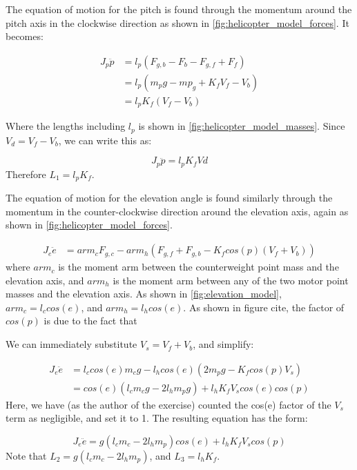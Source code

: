 The equation of motion for the pitch is found through the momentum
around the pitch axis in the clockwise direction as shown in
\cref{fig:helicopter_model_forces}. It becomes:

\begin{align*}
  J_p\ddot{p} &= l_p(F_{g,b} - F_b - F_{g,f} + F_f) \\
              &= l_p(m_pg - mp_g + K_fV_f - V_b) \\
              &= l_pK_f(V_f-V_b)
\end{align*}

Where the lengths including $l_p$ is shown in \cref{fig:helicopter_model_masses}. Since $V_d = V_f-V_b$, we can write this as:

\begin{equation}
\label{eq:pitch EoM}
  J_p\ddot{p} = l_pK_fVd
\end{equation}
Therefore $L_1 = l_pK_f$.

The equation of motion for the elevation angle is found similarly
through the momentum in the counter-clockwise direction around the
elevation axis, again as shown in \cref{fig:helicopter_model_forces}.

\begin{align*}
  J_e\ddot{e} &= arm_cF_{g,c} - arm_h(F_{g,f}+F_{g,b} - K_fcos(p)(V_f + V_b))
\end{align*}
where $arm_c$ is the moment arm between the counterweight point mass
and the elevation axis, and $arm_h$ is the moment arm between any of
the two motor point masses and the elevation axis. As shown in
\cref{fig:elevation_model}, $arm_c = l_ccos(e)$, and $arm_h =
l_hcos(e)$. As shown in figure cite, the factor of $cos(p)$ is due to the fact that

We can immediately substitute $V_s = V_f + V_b$, and simplify:

\begin{align*}
  J_e\ddot{e} &= l_ccos(e)m_cg - l_hcos(e)(2m_pg - K_fcos(p)V_s) \\
              &= cos(e)(l_cm_cg - 2l_hm_pg) + l_hK_fV_scos(e)cos(p)
\end{align*}
Here, we have (as the author of the exercise) counted the cos(e)
factor of the $V_s$ term as negligible, and set it to 1.  The resulting equation has the form:

\begin{equation}
\label{eq:elevation EoM}
  J_e\ddot{e} = g(l_cm_c - 2l_hm_p)cos(e) + l_hK_fV_scos(p)
\end{equation}
Note that $L_2 = g(l_cm_c-2l_hm_p)$, and $L_3 = l_hK_f$.

